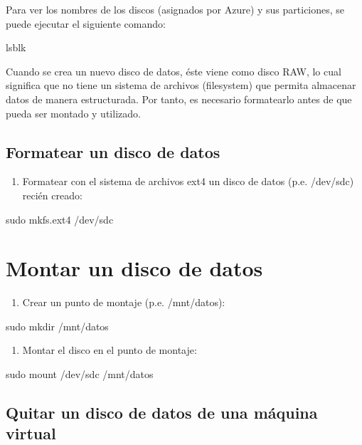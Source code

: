Para ver los nombres de los discos (asignados por Azure) y sus particiones, se puede ejecutar el siguiente comando:

\begin{SourceCode}
lsblk
\end{SourceCode}

Cuando se crea un nuevo disco de datos, éste viene como disco RAW, lo cual significa que no tiene un sistema de archivos (filesystem) que permita almacenar datos de manera estructurada. Por tanto, es necesario formatearlo antes de que pueda ser montado y utilizado.

\subsection{Formatear un disco de datos}

\begin{enumerate}
\item Formatear con el sistema de archivos ext4 un disco de datos (p.e. /dev/sdc) recién creado:
\end{enumerate}

\begin{SourceCode}
sudo mkfs.ext4 /dev/sdc
\end{SourceCode}

\section{Montar un disco de datos}

\begin{enumerate}
\item Crear un punto de montaje (p.e. /mnt/datos):
\end{enumerate}

\begin{SourceCode}
sudo mkdir /mnt/datos
\end{SourceCode}

\begin{enumerate}
\item Montar el disco en el punto de montaje:
\end{enumerate}

\begin{SourceCode}
sudo mount /dev/sdc /mnt/datos
\end{SourceCode}

\subsection{Quitar un disco de datos de una máquina virtual}

